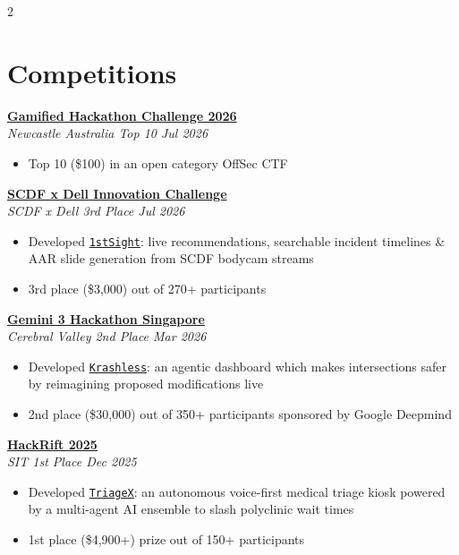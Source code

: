 \documentclass[a4paper,11pt]{article}
\newcommand{\entryHeader}[2]{\noindent\textbf{#1} \\ \textit{#2}}
\begin{document}
\begin{multicols}{2}
\raggedcolumns

\section*{Competitions}
\smallskip
\entryHeader{\href{https://www.instagram.com/p/DZUa_dYlRYs}{Gamified Hackathon Challenge 2026}}{Newcastle Australia \hfill Top 10 \textbar{} Jul 2026}
\begin{itemize}
    \item Top 10 (\$100) in an open category OffSec CTF
\end{itemize}

\smallskip
\entryHeader{\href{https://www.instagram.com/p/DXJYR7MFRDe}{SCDF x Dell Innovation Challenge}}{SCDF x Dell \hfill 3rd Place \textbar{} Jul 2026}
\begin{itemize}
    \item Developed \href{https://github.com/adoreblvnk/1stSight}{\texttt{1stSight}}: live recommendations, searchable incident timelines \& AAR slide generation from SCDF bodycam streams
    \item 3rd place (\$3,000) out of 270+ participants
\end{itemize}

\smallskip
\entryHeader{\href{https://cerebralvalley.ai/e/gemini-3-singapore-hackathon/hackathon/gallery}{Gemini 3 Hackathon Singapore}}{Cerebral Valley \hfill 2nd Place \textbar{} Mar 2026}
\begin{itemize}
    \item Developed \href{https://github.com/adoreblvnk/krashless}{\texttt{Krashless}}: an agentic dashboard which makes intersections safer by reimagining proposed modifications live
    \item 2nd place (\$30,000) out of 350+ participants sponsored by Google Deepmind
\end{itemize}

\entryHeader{\href{https://hackrift2025.devpost.com}{HackRift 2025}}{SIT \hfill 1st Place \textbar{} Dec 2025}
\begin{itemize}
    \item Developed \href{https://github.com/adoreblvnk/triageX}{\texttt{TriageX}}: an autonomous voice-first medical triage kiosk powered by a multi-agent AI ensemble to slash polyclinic wait times
    \item 1st place (\$4,900+) prize out of 150+ participants
\end{itemize}


\end{multicols}
\end{document}
